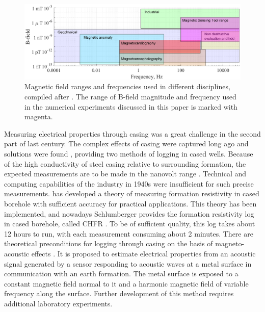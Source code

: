 \documentclass[10pt,twoside]{article}
\begin{document}
\begin{figure}[ht!]
\centering
\includegraphics[scale=0.85]{sensors_range.eps}
\vskip2pt
\caption{{Magnetic field ranges and frequencies used in different disciplines, compiled after \citet{Ripka2001}. The range of B-field magnitude and frequency used in the numerical experiments discussed in this paper is marked with magenta.}}
\label{sensors_range}
\end{figure}

Measuring electrical properties through casing was a great challenge in the second part of last century. The complex effects of casing were captured long ago and solutions were found \citep{Alpin1939, Stewart1949}, providing two methods of logging in cased wells. Because of the high conductivity of steel casing relative to surrounding formation, the expected measurements are to be made in the nanovolt range \citep{Aulia2001}. Technical and computing capabilities of the industry in 1940s were insufficient for such precise measurements. \citet{Kaufman1990} has developed a theory of measuring formation resistivity in cased borehole with sufficient accuracy for practical applications. This theory has been implemented, and nowadays Schlumberger provides the formation resistivity log in cased borehole, called CHFR \citep{Aulia2001, Gyllensten2001}. To be of sufficient quality, this log takes about 12 hours to run, with each measurement consuming about 2 minutes. There are theoretical preconditions for logging through casing on the basis of magneto-acoustic effects \citep{Dorovsky2013,Dorovsky2017}. It is proposed to estimate electrical properties from an acoustic signal generated by a sensor responding to acoustic waves at a metal surface in communication with an earth formation. The metal surface is exposed to a constant magnetic field normal to it and a harmonic magnetic field of variable frequency along the surface. Further development of this method requires additional laboratory experiments.
\end{document}
